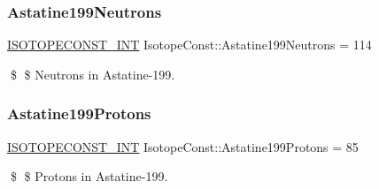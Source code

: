 \subsubsection{\texorpdfstring{Astatine199\+Neutrons}{Astatine199Neutrons}}
{\footnotesize\ttfamily \mbox{\hyperlink{group___isotope_const-_macros_ga5f18360b3e99483a35c32d789e62621c}{I\+S\+O\+T\+O\+P\+E\+C\+O\+N\+S\+T\+\_\+\+I\+NT}} Isotope\+Const\+::\+Astatine199\+Neutrons = 114}

\$ \$ Neutrons in Astatine-\/199. \mbox{\label{group___isotope_const-_astatine-_at199_ga9fa6409458dc25edf609312a45bfb009}} 
\subsubsection{\texorpdfstring{Astatine199\+Protons}{Astatine199Protons}}
{\footnotesize\ttfamily \mbox{\hyperlink{group___isotope_const-_macros_ga5f18360b3e99483a35c32d789e62621c}{I\+S\+O\+T\+O\+P\+E\+C\+O\+N\+S\+T\+\_\+\+I\+NT}} Isotope\+Const\+::\+Astatine199\+Protons = 85}

\$ \$ Protons in Astatine-\/199. 